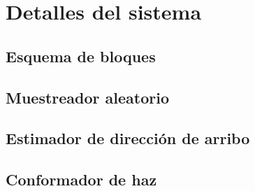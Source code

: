 \chapter{Detalles del sistema}\label{ch:sistema}

\section{Esquema de bloques}\label{sec:sistema_bloques}

\section{Muestreador aleatorio}\label{sec:sistema_randomsampler}

\section{Estimador de dirección de arribo}\label{sec:sistema_doa_estimator}

\section{Conformador de haz}\label{sec:sistema_beamformer}



